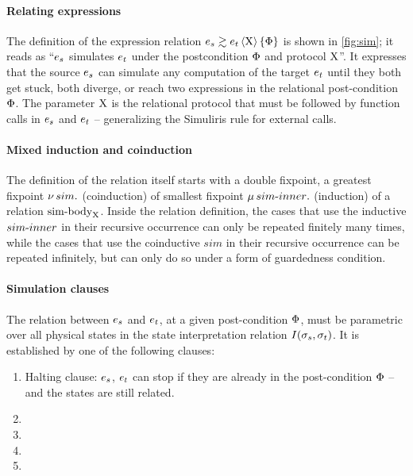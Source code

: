\paragraph{Relating expressions} The definition of the expression relation $\iSim[\iProt]{\iPred}{\datalangExpr_s}{\datalangExpr_t}$ is shown in \cref{fig:sim}; it reads as ``$\datalangExpr_s$ simulates $\datalangExpr_t$ under the postcondition $\Phi$ and protocol $\mathrm{X}$''. It expresses that the source $\datalangExpr_s$ can simulate any computation of the target $\datalangExpr_t$ until they both get stuck, both diverge, or reach two expressions in the relational post-condition $\Phi$. The parameter $\mathrm{X}$ is the relational protocol that must be followed by function calls in $\datalangExpr_s$ and $\datalangExpr_t$ -- generalizing the Simuliris rule for external calls.

\paragraph{Mixed induction and coinduction}
The definition of the relation itself starts with a double fixpoint, a greatest fixpoint $\operatorname{\nu} sim .$ (coinduction) of smallest fixpoint $\operatorname{\mu} {sim {\hbox{-}} inner} .$ (induction) of a relation $\mathrm{sim {\hbox{-}} body}_{\mathrm{X}}$. Inside the relation definition, the cases that use the inductive $sim {\hbox{-}} inner$ in their recursive occurrence can only be repeated finitely many times, while the cases that use the coinductive $sim$ in their recursive occurrence can be repeated infinitely, but can only do so under a form of guardedness condition.

\clearpage


\paragraph{Simulation clauses} The relation between $\datalangExpr_s$ and $\datalangExpr_t$, at a given post-condition $\Phi$, must be parametric over all physical states in the state interpretation relation $I(\datalangState_s, \datalangState_t)$. It is established by one of the following clauses:

\begin{enumerate}
\item[\circled{1}] Halting clause: $\datalangExpr_s$, $\datalangExpr_t$ can stop if they are already in the post-condition $\Phi$ -- and the states are still related.
\item[\circled{2}]
\item[\circled{3}]
\item[\circled{4}]
\item[\circled{5}]
\end{enumerate}

